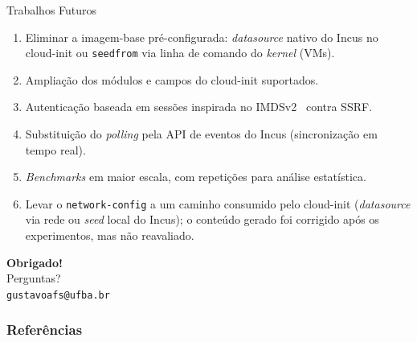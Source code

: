 \documentclass[aspectratio=169,xcolor=table]{beamer}
\begin{document}
\begin{frame}{Trabalhos Futuros}
    \begin{enumerate}
        \item Eliminar a imagem-base pré-configurada: \textit{datasource} nativo do
              Incus no cloud-init ou \texttt{seedfrom} via linha de comando do
              \textit{kernel} (VMs).
        \item Ampliação dos módulos e campos do cloud-init suportados.
        \item Autenticação baseada em sessões inspirada no
              IMDSv2~\cite{aws_imdsv2} contra SSRF.
        \item Substituição do \textit{polling} pela API de eventos do Incus
              (sincronização em tempo real).
        \item \textit{Benchmarks} em maior escala, com repetições para análise estatística.
        \item Levar o \texttt{network-config} a um caminho consumido pelo cloud-init
              (\textit{datasource} via rede ou \textit{seed} local do Incus); o conteúdo
              gerado foi corrigido após os experimentos, mas não reavaliado.
    \end{enumerate}
\end{frame}

\begin{frame}
    \centering
    \vspace{2cm}
    {\LARGE \textbf{Obrigado!}}\\[1cm]
    {\large Perguntas?}\\[1.5cm]
    \texttt{gustavoafs@ufba.br}
\end{frame}

\begin{frame}
    \frametitle{Referências}
    
    
\end{frame}
\end{document}
